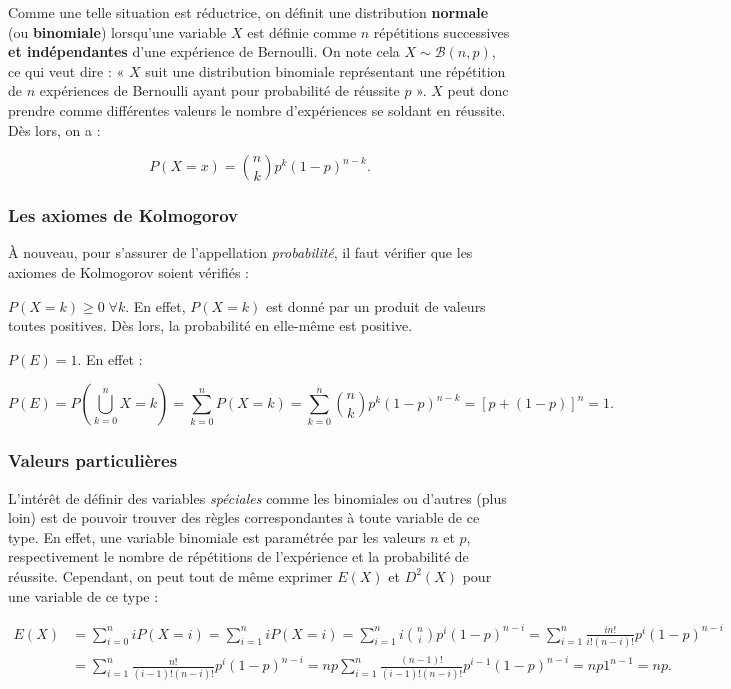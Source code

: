 \documentclass{article}
\begin{document}
		Comme une telle situation est réductrice, on définit une distribution \textbf{normale} (ou \textbf{binomiale}) lorsqu'une variable $X$ est définie comme
		$n$ répétitions successives \textbf{et indépendantes} d'une expérience de Bernoulli. On note cela $X \sim \mathcal B(n, p)$, ce qui veut dire : « $X$ suit une
		distribution binomiale représentant une répétition de $n$ expériences de Bernoulli ayant pour probabilité de réussite $p$ ». $X$ peut donc prendre comme différentes
		valeurs le nombre d'expériences se soldant en réussite. Dès lors, on a :

		\[P(X = x) = \binom nkp^k(1-p)^{n-k}.\]

		\subsubsection{Les axiomes de Kolmogorov}
			À nouveau, pour s'assurer de l'appellation \textit{probabilité}, il faut vérifier que les axiomes de Kolmogorov soient vérifiés :

			$P(X=k) \geq 0 \; \forall k$. En effet, $P(X=k)$ est donné par un produit de valeurs toutes positives. Dès lors, la probabilité en elle-même est positive.

			$P(E) = 1.$ En effet :
			
			\[P(E) = P\left(\bigcup_{k=0}^nX=k\right) = \sum_{k=0}^nP(X=k) = \sum_{k=0}^n\binom nkp^k(1-p)^{n-k} = \left[p + (1-p)\right]^n = 1.\]

		\subsubsection{Valeurs particulières}
			L'intérêt de définir des variables \textit{spéciales} comme les binomiales ou d'autres (plus loin) est de pouvoir trouver des règles correspondantes
			à toute variable de ce type. En effet, une variable binomiale est paramétrée par les valeurs $n$ et $p$, respectivement le nombre de répétitions de l'expérience
			et la probabilité de réussite. Cependant, on peut tout de même exprimer $E(X)$ et $D^2(X)$ pour une variable de ce type :

			\[\begin{aligned}
				E(X) &= \sum_{i=0}^niP(X=i) = \sum_{i=1}^niP(X=i) = \sum_{i=1}^ni\binom nip^i(1-p)^{n-i} = \sum_{i=1}^n\frac {in!}{i!(n-i)!}p^i(1-p)^{n-i} \\
				&= \sum_{i=1}^n\frac {n!}{(i-1)!(n-i)!}p^i(1-p)^{n-i} = np\sum_{i=1}^n\frac {(n-1)!}{(i-1)!(n-i)!}p^{i-1}(1-p)^{n-i} = np1^{n-1} = np.
			\end{aligned}\]
\end{document}

